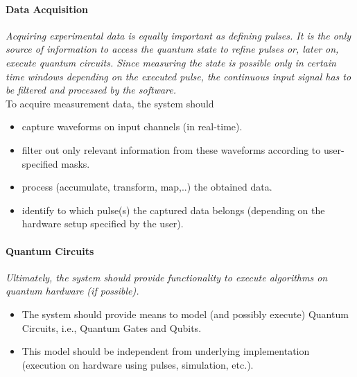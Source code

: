 \documentclass[a4paper,12pt]{article}
\begin{document}
\paragraph{Data Acquisition}
\textit{Acquiring experimental data is equally important as defining pulses. It is the only source of information to access the quantum state to refine pulses or, later on, execute quantum circuits. Since measuring the state is possible only in certain time windows depending on the executed pulse, the continuous input signal has to be filtered and processed by the software.}\\
To acquire measurement data, the system should
\begin{itemize} \itemsep-0.5pt
 \item capture waveforms on input channels (in real-time).
 \item filter out only relevant information from these waveforms according to user-specified masks.
 \item process (accumulate, transform, map,..) the obtained data.
 \item identify to which pulse(s) the captured data belongs (depending on the hardware setup specified by the user).
\end{itemize}

\paragraph{Quantum Circuits}
\textit{Ultimately, the system should provide functionality to execute algorithms on quantum hardware (if possible).}
\begin{itemize} \itemsep-0.5pt
 \item The system should provide means to model (and possibly execute) Quantum Circuits, i.e., Quantum Gates and Qubits.
 \item This model should be independent from underlying implementation (execution on hardware using pulses, simulation, etc.).
\end{itemize}
\end{document}
